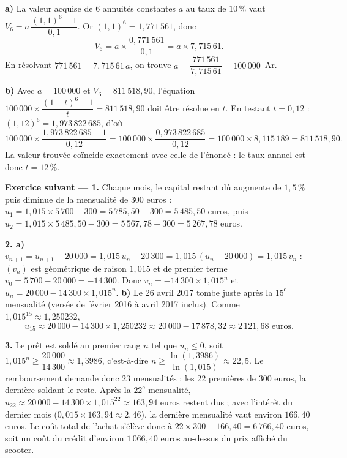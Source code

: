 \begin{corrige}[annales]
\textbf{a)} La valeur acquise de $6$ annuités constantes $a$ au taux de
$10\,\%$ vaut
$V_{6} = a\,\dfrac{(1{,}1)^{6}-1}{0{,}1}$. Or $(1{,}1)^{6} = 1{,}771\,561$,
donc
\[
  V_{6} = a \times \frac{0{,}771\,561}{0{,}1} = a \times 7{,}715\,61 .
\]
En résolvant $771\,561 = 7{,}715\,61\,a$, on trouve
$a = \dfrac{771\,561}{7{,}715\,61} = 100\,000$~Ar.

\textbf{b)} Avec $a = 100\,000$ et $V_{6} = 811\,518{,}90$, l'équation
$100\,000 \times \dfrac{(1+t)^{6}-1}{t} = 811\,518{,}90$ doit être résolue
en $t$. En testant $t = 0{,}12$ :
$(1{,}12)^{6} = 1{,}973\,822\,685$, d'où
\[
  100\,000 \times \frac{1{,}973\,822\,685-1}{0{,}12}
  = 100\,000 \times \frac{0{,}973\,822\,685}{0{,}12}
  = 100\,000 \times 8{,}115\,189
  = 811\,518{,}90 .
\]
La valeur trouvée coïncide exactement avec celle de l'énoncé : le taux
annuel est donc $t = 12\,\%$.

\textbf{Exercice suivant — 1.} Chaque mois, le capital restant dû augmente
de $1{,}5\,\%$ puis diminue de la mensualité de $300$ euros :
$u_{1} = 1{,}015\times5\,700-300 = 5\,785{,}50-300 = 5\,485{,}50$ euros, puis
$u_{2} = 1{,}015\times5\,485{,}50-300 = 5\,567{,}78-300 = 5\,267{,}78$ euros.

\textbf{2. a)} $v_{n+1} = u_{n+1}-20\,000 = 1{,}015\,u_{n}-20\,300
= 1{,}015\,(u_{n}-20\,000) = 1{,}015\,v_{n}$ : $(v_{n})$ est géométrique de
raison $1{,}015$ et de premier terme $v_{0} = 5\,700-20\,000 = -14\,300$.
Donc $v_{n} = -14\,300\times1{,}015^{n}$ et
$u_{n} = 20\,000-14\,300\times1{,}015^{n}$.
\textbf{b)} Le 26 avril 2017 tombe juste après la $15^{\text{e}}$
mensualité (versée de février 2016 à avril 2017 inclus). Comme
$1{,}015^{15} \approx 1{,}250232$,
\[
  u_{15} \approx 20\,000-14\,300\times1{,}250232 \approx
  20\,000-17\,878{,}32 \approx 2\,121{,}68 \text{ euros.}
\]

\textbf{3.} Le prêt est soldé au premier rang $n$ tel que $u_{n}\leq0$, soit
$1{,}015^{n} \geq \dfrac{20\,000}{14\,300} \approx 1{,}3986$, c'est-à-dire
$n \geq \dfrac{\ln(1{,}3986)}{\ln(1{,}015)} \approx 22{,}5$. Le remboursement
demande donc $23$ mensualités : les $22$ premières de $300$ euros, la
dernière soldant le reste. Après la $22^{\text{e}}$ mensualité,
$u_{22} \approx 20\,000-14\,300\times1{,}015^{22} \approx 163{,}94$ euros
restent dus ; avec l'intérêt du dernier mois
($0{,}015\times163{,}94\approx2{,}46$), la dernière mensualité vaut environ
$166{,}40$ euros. Le coût total de l'achat s'élève donc à
$22\times300+166{,}40 = 6\,766{,}40$ euros, soit un coût du crédit d'environ
$1\,066{,}40$ euros au-dessus du prix affiché du scooter.
\end{corrige}

